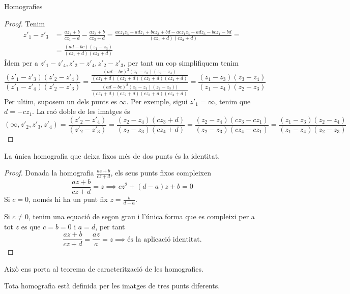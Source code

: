 \documentclass[dvipsnames, svgnames, leqno, a4paper, 12pt]{report}
\begin{document}
\begin{chapter}{Homografies}
\begin{proof}
        Tenim \begin{align*}
            z'_1-z'_3 &=\frac{az_1+b}{cz_1+d}-\frac{az_3+b}{cz_3+d} = \frac{acz_1z_3+adz_1+bcz_3+bd-acz_1z_3-adz_3-bcz_1-bd}{(cz_1+d)(cz_3+d)} = \\
            &= \frac{(ad-bc)(z_1-z_3)}{(cz_1+d)(cz_3+d)}
        \end{align*}
        Ídem per a $z'_1-z'_4, z'_2-z'_4, z'_2-z'_3$, per tant un cop simplifiquem tenim 
        \begin{displaymath}
            \frac{(z'_1-z'_3)(z'_2-z'_4)}{(z'_1-z'_4)(z'_2-z'_3)}=\frac{\frac{(ad-bc)^2(z_1-z_3)(z_2-z_4)}{(cz_1+d)(cz_2+d)(cz_3+d)(cz_4+d)}}{\frac{(ad-bc)^2(z_1-z_4)(z_2-z_3))}{(cz_1+d)(cz_2+d)(cz_3+d)(cz_4+d)}} = \frac{(z_1-z_3)(z_3-z_4)}{(z_1-z_4)(z_2-z_3)}
        \end{displaymath}
        Per ultim, suposem un dels punts es $\infty$. Per exemple, sigui $z'_1=\infty$, tenim que $d=-cz_1$. La raó doble de les imatges és \begin{displaymath}
            (\infty,z'_2,z'_3,z'_4)=\frac{(z'_2-z'_4)}{(z'_2-z'_3)}=\frac{(z_2-z_4)(cz_3+d)}{(z_2-z_3)(cz_4+d)}=\frac{(z_2-z_4)(cz_3-cz_1)}{(z_2-z_3)(cz_4-cz_1)}=\frac{(z_1-z_3)(z_2-z_4)}{(z_1-z_4)(z_2-z_3)}
        \end{displaymath}
    \end{proof}
    \begin{theorem}
        La única homografia que deixa fixos més de dos punts és la identitat.
    \end{theorem}
    \begin{proof}
        Donada la homografia $\frac{az+b}{cz+d}$, els seus punts fixos compleixen \begin{displaymath}
            \frac{az+b}{cz+d}=z\implies cz^2+(d-a)z+b=0
        \end{displaymath}
        Si $c=0$, només hi ha un punt fix $z=\frac{b}{d-a}$.

        Si $c\neq0$, tenim una equació de segon grau i l'única forma que es compleixi per a tot $z$ es que $c=b=0$ i $a=d$, per tant \begin{displaymath}
            \frac{az+b}{cz+d}=\frac{az}{a}=z\implies \text{és la aplicació identitat.}
        \end{displaymath}
    \end{proof}
    Això ens porta al teorema de caracterització de les homografies.
    \begin{theorem}
        Tota homografia està definida per les imatges de tres punts diferents. 


\end{theorem}
\end{chapter}
\end{document}
